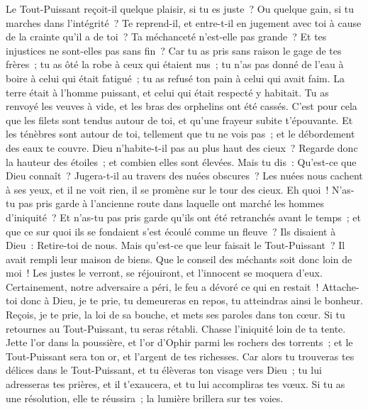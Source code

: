 \begin{multicols}{2}
Le Tout-Puissant reçoit-il quelque plaisir, si tu es juste~? Ou quelque gain, si tu marches dans l'intégrité~?
Te reprend-il, et entre-t-il en jugement avec toi à cause de la crainte qu'il a de toi~?
Ta méchanceté n'est-elle pas grande~? Et tes injustices ne sont-elles pas sans fin~?
Car tu as pris sans raison le gage de tes frères~; tu as ôté la robe à ceux qui étaient nus~;
tu n'as pas donné de l'eau à boire à celui qui était fatigué~; tu as refusé ton pain à celui qui avait faim.
La terre était à l'homme puissant, et celui qui était respecté y habitait.
Tu as renvoyé les veuves à vide, et les bras des orphelins ont été cassés.
C'est pour cela que les filets sont tendus autour de toi, et qu'une frayeur subite t'épouvante.
Et les ténèbres sont autour de toi, tellement que tu ne vois pas~; et le débordement des eaux te couvre.
Dieu n'habite-t-il pas au plus haut des cieux~? Regarde donc la hauteur des étoiles~; et combien elles sont élevées.
Mais tu dis~: Qu'est-ce que Dieu connaît~? Jugera-t-il au travers des nuées obscures~?
Les nuées nous cachent à ses yeux, et il ne voit rien, il se promène sur le tour des cieux.
Eh quoi~! N'as-tu pas pris garde à l'ancienne route dans laquelle ont marché les hommes d'iniquité~?
Et n'as-tu pas pris garde qu'ils ont été retranchés avant le temps~; et que ce sur quoi ils se fondaient s'est écoulé comme un fleuve~?
Ils disaient à Dieu~: Retire-toi de nous. Mais qu'est-ce que leur faisait le Tout-Puissant~?
Il avait rempli leur maison de biens. Que le conseil des méchants soit donc loin de moi~!
Les justes le verront, se réjouiront, et l'innocent se moquera d'eux.
Certainement, notre adversaire a péri, le feu a dévoré ce qui en restait~!
Attache-toi donc à Dieu, je te prie, tu demeureras en repos, tu atteindras ainsi le bonheur.
Reçois, je te prie, la loi de sa bouche, et mets ses paroles dans ton cœur.
Si tu retournes au Tout-Puissant, tu seras rétabli. Chasse l'iniquité loin de ta tente.
Jette l'or dans la poussière, et l'or d'Ophir parmi les rochers des torrents~;
et le Tout-Puissant sera ton or, et l'argent de tes richesses.
Car alors tu trouveras tes délices dans le Tout-Puissant, et tu élèveras ton visage vers Dieu~;
tu lui adresseras tes prières, et il t'exaucera, et tu lui accompliras tes vœux.
Si tu as une résolution, elle te réussira~; la lumière brillera sur tes voies.

\end{multicols}
